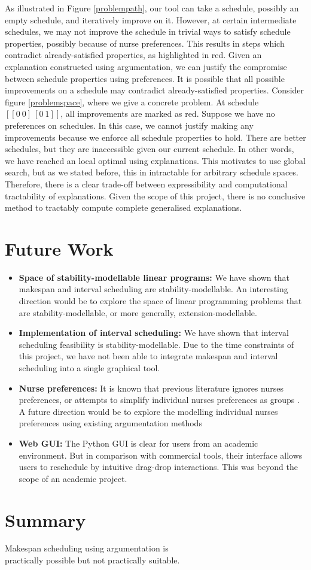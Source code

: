 As illustrated in Figure \ref{problempath}, our tool can take a schedule, possibly an empty schedule, and iteratively improve on it. However, at certain intermediate schedules, we may not improve the schedule in trivial ways to satisfy schedule properties, possibly because of nurse preferences. This results in steps which contradict already-satisfied properties, as highlighted in red. Given an explanation constructed using argumentation, we can justify the compromise between schedule properties using preferences.
\linespace
It is possible that all possible improvements on a schedule may contradict already-satisfied properties. Consider figure \ref{problemspace}, where we give a concrete problem. At schedule $[[0\ 0]\ [0\ 1]]$, all improvements are marked as red. Suppose we have no preferences on schedules. In this case, we cannot justify making any improvements because we enforce all schedule properties to hold. There are better schedules, but they are inaccessible given our current schedule. In other words, we have reached an local optimal using explanations. This motivates to use global search, but as we stated before, this in intractable for arbitrary schedule spaces. Therefore, there is a clear trade-off between expressibility and computational tractability of explanations. Given the scope of this project, there is no conclusive method to tractably compute complete generalised explanations.

\section{Future Work}

\begin{itemize}
	\item\textbf{Space of stability-modellable linear programs:} We have shown that makespan and interval scheduling are stability-modellable. An interesting direction would be to explore the space of linear programming problems that are stability-modellable, or more generally, extension-modellable.
	\item\textbf{Implementation of interval scheduling:} We have shown that interval scheduling feasibility is stability-modellable. Due to the time constraints of this project, we have not been able to integrate makespan and interval scheduling into a single graphical tool.
	\item\textbf{Nurse preferences:} It is known that previous literature ignores nurses preferences, or attempts to simplify individual nurses preferences as groups \cite{preferences}. A future direction would be to explore the modelling individual nurses preferences using existing argumentation methods \cite{acceptability, aba}
	\item\textbf{Web GUI:} The Python GUI is clear for users from an academic environment. But in comparison with commercial tools, their interface allows users to reschedule by intuitive drag-drop interactions. This was beyond the scope of an academic project.
\end{itemize}

\section{Summary}

\begin{framed}
	\centering
	Makespan scheduling using argumentation is\\practically
	possible but not practically suitable.
\end{framed}